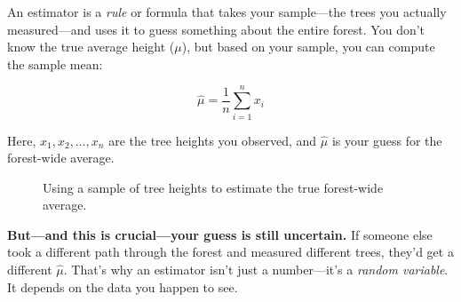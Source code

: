 An estimator is a \textit{rule} or formula that takes your sample—the trees you actually measured—and uses it to guess something about the entire forest. You don't know the true average height (\( \mu \)), but based on your sample, you can compute the sample mean:

\[
\hat{\mu} = \frac{1}{n} \sum_{i=1}^n x_i
\]

Here, \( x_1, x_2, \dots, x_n \) are the tree heights you observed, and \( \hat{\mu} \) is your guess for the forest-wide average.

\begin{figure}[H]
\centering
{}
\caption{Using a sample of tree heights to estimate the true forest-wide average.}
\end{figure}


\textbf{But—and this is crucial—your guess is still uncertain.} If someone else took a different path through the forest and measured different trees, they’d get a different \( \hat{\mu} \). That’s why an estimator isn’t just a number—it’s a \textit{random variable}. It depends on the data you happen to see.

